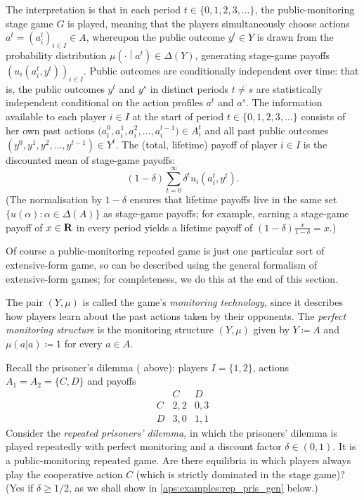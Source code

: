The interpretation is that in each period $t \in \{0,1,2,3,\dots\}$, the public-monitoring stage game $G$ is played, meaning that the players simultaneously choose actions $a^t = \left(a_i^t\right)_{i \in I} \in A$, whereupon the public outcome $y^t \in Y$ is drawn from the probability distribution $\mu\left(\cdot\middle|a^t\right) \in \Delta(Y)$, generating stage-game payoffs $\left(u_i\left(a_i^t,y^t\right)\right)_{i \in I}$. Public outcomes are conditionally independent over time: that is, the public outcomes $y^t$ and $y^s$ in distinct periods $t \neq s$ are statistically independent conditional on the action profiles $a^t$ and $a^s$. The information available to each player $i \in I$ at the start of period $t \in \{0,1,2,3,\dots\}$ consists of her own past actions $\bigl( a_i^0, a_i^1, a_i^2, \dots, a_i^{t-1} \bigr) \in A_i^t$ and all past public outcomes $(y^0,y^1,y^2,\dots,y^{t-1}) \in Y^t$. The (total, lifetime) payoff of player $i \in I$ is the discounted mean of stage-game payoffs:
%
\begin{equation*}
	(1-\delta) \sum_{t=0}^\infty \delta^t u_i\left( a_i^t, y^t \right) .
\end{equation*}
%
(The normalisation by $1-\delta$ ensures that lifetime payoffs live in the same set $\{ u(\alpha) : \alpha \in \Delta(A) \}$ as stage-game payoffs; for example, earning a stage-game payoff of $x \in \mathbf{R}$ in every period yields a lifetime payoff of $(1-\delta) \frac{x}{1-\delta} = x$.)

Of course a public-monitoring repeated game is just one particular sort of extensive-form game, so can be described using the general formalism of extensive-form games; for completeness, we do this at the end of this section.

The pair $(Y,\mu)$ is called the game's \emph{monitoring technology,} since it describes how players learn about the past actions taken by their opponents. The \emph{perfect monitoring structure} is the monitoring structure $(Y,\mu)$ given by $Y \coloneqq A$ and $\mu(a|a) \coloneqq 1$ for every $a \in A$.

\begin{example}
	\label{example:rep_pris}
	Recall the prisoner's dilemma ( above): players $I=\{1,2\}$, actions $A_1=A_2=\{C,D\}$ and payoffs
	\begin{equation*}
		\begin{array}{c|cc}
			  & C   & D   \\ \hline
			C & 2,2 & 0,3 \\
			D & 3,0 & 1,1
		\end{array} 
	\end{equation*}
	Consider the \emph{repeated prisoners' dilemma,} in which the prisoners' dilemma is played repeatedly with perfect monitoring and a discount factor $\delta \in (0,1)$. It is a public-monitoring repeated game. Are there equilibria in which players always play the cooperative action $C$ (which is strictly dominated in the stage game)? (Yes if $\delta \geq 1/2$, as we shall show in \cref{aps:examples:rep_pris_gen} below.)
\end{example}

